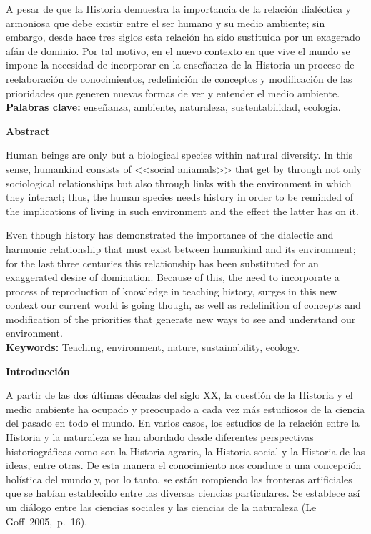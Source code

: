 A pesar de que la Historia demuestra la importancia de la relación 
dialéctica y armoniosa que debe existir entre el ser humano y su medio 
ambiente; sin embargo, desde hace tres siglos esta relación ha sido 
sustituida por un exagerado afán de dominio. Por tal motivo, en el 
nuevo contexto en que vive el mundo se impone la necesidad de 
incorporar en la enseñanza de la Historia un proceso de reelaboración 
de conocimientos, redefinición de conceptos y modificación de las 
prioridades que generen nuevas formas de ver y entender el medio 
ambiente.\\
{\bfseries Palabras clave:} enseñanza, ambiente, naturaleza, sustentabilidad, 
ecología.

\medskip
{\bfseries Abstract} 

Human beings are only but a biological species within natural 
diversity. In this sense, humankind consists of <<social aniamals>> that 
get by through not only sociological relationships but also through 
links with the environment in which they interact; thus, the human 
species needs history in order to be reminded of the implications of 
living in such environment and the effect the latter has on it.

Even though history has demonstrated the importance of the dialectic 
and harmonic relationship that must exist between humankind and its 
environment; for the last three centuries this relationship has been 
substituted for an exaggerated desire of domination. Because of this, 
the need to incorporate a process of reproduction of knowledge in 
teaching history, surges in this new context our current world is going 
though, as well as redefinition of concepts and modification of the 
priorities that generate new ways to see and understand our 
environment.\\
{\bfseries Keywords:}  Teaching, environment, nature, sustainability, ecology.

\bigskip
{\bfseries Introducción}
\enlargethispage{1\baselineskip}

A partir de las dos últimas décadas del siglo XX, la cuestión de la 
Historia y el medio ambiente ha ocupado y preocupado a cada vez más 
estudiosos de la ciencia del pasado en todo el mundo. En varios casos, 
los estudios de la relación entre la Historia y la naturaleza se han 
abordado desde diferentes perspectivas historiográficas como son la 
Historia agraria, la Historia social y la Historia de las ideas, entre 
otras. De esta manera el conocimiento nos conduce a una concepción 
holística del mundo y, por lo tanto, se están rompiendo las fronteras 
artificiales que se habían establecido entre las diversas ciencias 
particulares. Se establece así un diálogo entre las ciencias sociales y 
las ciencias de la naturaleza (Le Goff~2005,~p.~16).


